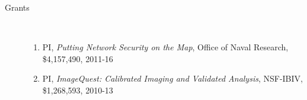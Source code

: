 \documentclass[10pt]{article}
\begin{document}
\begin{description}




\item [Grants]\
\begin{enumerate}

\item PI, {\em Putting Network Security on the Map}, Office of Naval Research, \$4,157,490, 2011-16

\item PI, {\em ImageQuest: Calibrated Imaging and Validated Analysis}, NSF-IBIV, \$1,268,593, 2010-13


\end{enumerate}
\end{description}
\end{document}
